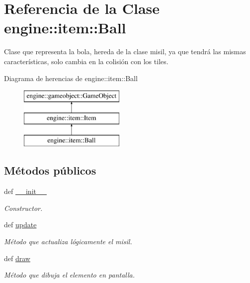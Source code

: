 \hypertarget{classengine_1_1item_1_1Ball}{
\section{\-Referencia de la \-Clase engine\-:\-:item\-:\-:\-Ball}
\label{classengine_1_1item_1_1Ball}
}


\-Clase que representa la bola, hereda de la clase misil, ya que tendrá las mismas características, solo cambia en la colisión con los tiles.  


\-Diagrama de herencias de engine\-:\-:item\-:\-:\-Ball\begin{figure}[H]
\begin{center}
\leavevmode
\includegraphics[height=3.000000cm]{classengine_1_1item_1_1Ball}
\end{center}
\end{figure}
\subsection*{\-Métodos públicos}
\begin{DoxyCompactItemize}
\item 
def \hyperlink{classengine_1_1item_1_1Ball_adc11e573592fcc516674d1e159743e8b}{\-\_\-\-\_\-init\-\_\-\-\_\-}
\begin{DoxyCompactList}\small\item\em \-Constructor. \end{DoxyCompactList}\item 
\hypertarget{classengine_1_1item_1_1Ball_a81b2da5b1b04f5054faea6efc674918c}{
def \hyperlink{classengine_1_1item_1_1Ball_a81b2da5b1b04f5054faea6efc674918c}{update}}
\label{classengine_1_1item_1_1Ball_a81b2da5b1b04f5054faea6efc674918c}

\begin{DoxyCompactList}\small\item\em \-Método que actualiza lógicamente el misil. \end{DoxyCompactList}\item 
def \hyperlink{classengine_1_1item_1_1Ball_aa2e1107f9349a187184b414d4204bb88}{draw}
\begin{DoxyCompactList}\small\item\em \-Método que dibuja el elemento en pantalla. \end{DoxyCompactList}\end{DoxyCompactItemize}
